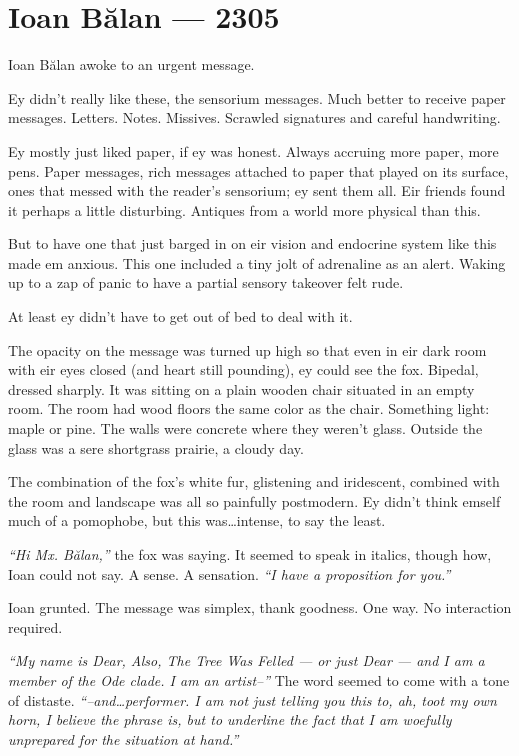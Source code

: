 \hypertarget{ioan-bux103lan-2305}{%
\chapter*{Ioan Bălan — 2305}\label{ioan-bux103lan-2305}}

Ioan Bălan awoke to an urgent message.

Ey didn't really like these, the sensorium messages. Much better to receive paper messages. Letters. Notes. Missives. Scrawled signatures and careful handwriting.

Ey mostly just liked paper, if ey was honest. Always accruing more paper, more pens. Paper messages, rich messages attached to paper that played on its surface, ones that messed with the reader's sensorium; ey sent them all. Eir friends found it perhaps a little disturbing. Antiques from a world more physical than this.

But to have one that just barged in on eir vision and endocrine system like this made em anxious. This one included a tiny jolt of adrenaline as an alert. Waking up to a zap of panic to have a partial sensory takeover felt rude.

At least ey didn't have to get out of bed to deal with it.

The opacity on the message was turned up high so that even in eir dark room with eir eyes closed (and heart still pounding), ey could see the fox. Bipedal, dressed sharply. It was sitting on a plain wooden chair situated in an empty room. The room had wood floors the same color as the chair. Something light: maple or pine. The walls were concrete where they weren't glass. Outside the glass was a sere shortgrass prairie, a cloudy day.

The combination of the fox's white fur, glistening and iridescent, combined with the room and landscape was all so painfully postmodern. Ey didn't think emself much of a pomophobe, but this was\ldots{}intense, to say the least.

\emph{``Hi Mx. Bălan,''} the fox was saying. It seemed to speak in italics, though how, Ioan could not say. A sense. A sensation. \emph{``I have a proposition for you.''}

Ioan grunted. The message was simplex, thank goodness. One way. No interaction required.

\emph{``My name is Dear, Also, The Tree Was Felled — or just Dear — and I am a member of the Ode clade. I am an artist--''} The word seemed to come with a tone of distaste. \emph{``--and\ldots{}performer. I am not just telling you this to, ah, toot my own horn, I believe the phrase is, but to underline the fact that I am woefully unprepared for the situation at hand.''}


